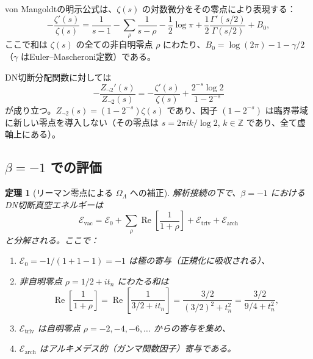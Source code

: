 \documentclass[12pt,a4paper]{article}
\newtheorem{theorem}{定理}[section]
\newcommand{\OL}{\Omega_\Lambda}
\begin{document}
von Mangoldtの明示公式は、$\zeta(s)$ の対数微分をその零点により表現する：
\begin{equation}\label{eq:vonMangoldt}
  -\frac{\zeta'(s)}{\zeta(s)} = \frac{1}{s-1} - \sum_\rho \frac{1}{s-\rho} - \frac{1}{2}\log\pi + \frac{1}{2}\frac{\Gamma'(s/2)}{\Gamma(s/2)} + B_0,
\end{equation}
ここで和は $\zeta(s)$ の全ての非自明零点 $\rho$ にわたり、$B_0 = \log(2\pi) - 1 - \gamma/2$（$\gamma$ はEuler--Mascheroni定数）である。

DN切断分配関数に対しては
\begin{equation}
  -\frac{Z_{\neg 2}'(s)}{Z_{\neg 2}(s)} = -\frac{\zeta'(s)}{\zeta(s)} + \frac{2^{-s}\log 2}{1-2^{-s}}
\end{equation}
が成り立つ。$Z_{\neg 2}(s) = (1-2^{-s})\zeta(s)$ であり、因子 $(1-2^{-s})$ は臨界帯域に新しい零点を導入しない（その零点は $s = 2\pi i k/\log 2$, $k \in \mathbb{Z}$ であり、全て虚軸上にある）。

\subsection{$\beta = -1$ での評価}

\begin{theorem}[リーマン零点による $\OL$ への補正]\label{thm:main}
解析接続の下で、$\beta = -1$ におけるDN切断真空エネルギーは
\begin{equation}\label{eq:main-decomposition}
  \mathcal{E}_{\mathrm{vac}} = \mathcal{E}_0 + \sum_{\rho}\operatorname{Re}\!\left[\frac{1}{1+\rho}\right] + \mathcal{E}_{\mathrm{triv}} + \mathcal{E}_{\mathrm{arch}}
\end{equation}
と分解される。ここで：
\begin{enumerate}[label=(\alph*)]
\item $\mathcal{E}_0 = -1/(1+1-1) = -1$ は極の寄与（正規化に吸収される）、
\item 非自明零点 $\rho = 1/2 + it_n$ にわたる和は
\begin{equation}\label{eq:zero-contribution}
  \operatorname{Re}\!\left[\frac{1}{1+\rho}\right] = \operatorname{Re}\!\left[\frac{1}{3/2 + it_n}\right] = \frac{3/2}{(3/2)^2 + t_n^2} = \frac{3/2}{9/4 + t_n^2},
\end{equation}
\item $\mathcal{E}_{\mathrm{triv}}$ は自明零点 $\rho = -2, -4, -6, \ldots$ からの寄与を集め、
\item $\mathcal{E}_{\mathrm{arch}}$ はアルキメデス的（ガンマ関数因子）寄与である。
\end{enumerate}
\end{theorem}
\end{document}
